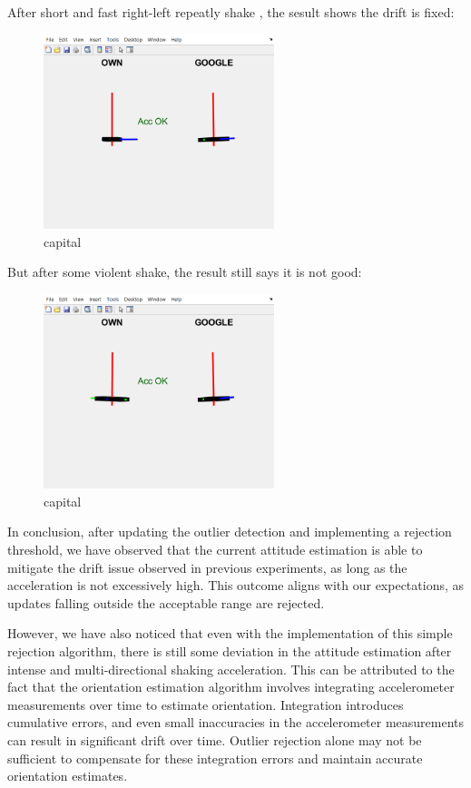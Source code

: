After short and fast right-left repeatly shake , the sesult shows the drift is fixed:

\begin{figure}[H]
 \centering
 \includegraphics[width=0.6\textwidth]{images/10rangeshake.png}
 \caption{capital}
 \label{label}
\end{figure}

But after some violent shake, the result still says it is not good:

\begin{figure}[H]
 \centering
 \includegraphics[width=0.6\textwidth]{images/violent10.png}
 \caption{capital}
 \label{label}
\end{figure}


In conclusion, after updating the outlier detection and implementing a rejection threshold, we have observed that the current attitude estimation is able to mitigate the drift issue observed in previous experiments, as long as the acceleration is not excessively high. This outcome aligns with our expectations, as updates falling outside the acceptable range are rejected.

However, we have also noticed that even with the implementation of this simple rejection algorithm, there is still some deviation in the attitude estimation after intense and multi-directional shaking acceleration. This can be attributed to the fact that the orientation estimation algorithm involves integrating accelerometer measurements over time to estimate orientation. Integration introduces cumulative errors, and even small inaccuracies in the accelerometer measurements can result in significant drift over time. Outlier rejection alone may not be sufficient to compensate for these integration errors and maintain accurate orientation estimates. 